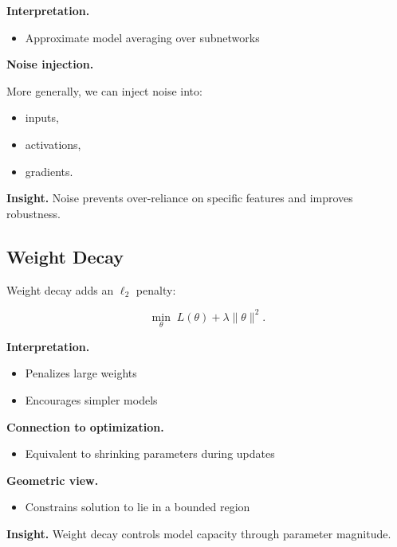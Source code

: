 \medskip

\noindent
\textbf{Interpretation.}
\begin{itemize}
    \item Approximate model averaging over subnetworks
\end{itemize}

\medskip

\noindent
\textbf{Noise injection.}

More generally, we can inject noise into:

\begin{itemize}
    \item inputs,
    \item activations,
    \item gradients.
\end{itemize}

\medskip

\noindent
\textbf{Insight.}  
Noise prevents over-reliance on specific features and improves robustness.

\subsection{Weight Decay}

Weight decay adds an $\ell_2$ penalty:

\[
\min_\theta \; L(\theta) + \lambda \|\theta\|^2.
\]

\medskip

\noindent
\textbf{Interpretation.}
\begin{itemize}
    \item Penalizes large weights
    \item Encourages simpler models
\end{itemize}

\medskip

\noindent
\textbf{Connection to optimization.}
\begin{itemize}
    \item Equivalent to shrinking parameters during updates
\end{itemize}

\medskip

\noindent
\textbf{Geometric view.}
\begin{itemize}
    \item Constrains solution to lie in a bounded region
\end{itemize}

\medskip

\noindent
\textbf{Insight.}  
Weight decay controls model capacity through parameter magnitude.

